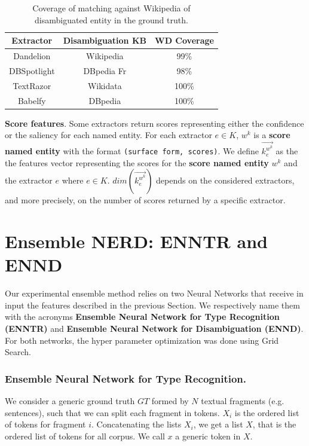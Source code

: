 \documentclass{llncs}
\begin{document}
\begin{table}
\centering
\label{tab:qmatch}
\begin{tabular}{|c|c|c|}
\hline
\textbf{Extractor} & \textbf{Disambiguation KB} & \textbf{WD Coverage} \\ \hline
Dandelion    & Wikipedia   & 99\%     \\ \hline
DBSpotlight  & DBpedia Fr  & 98\%     \\ \hline
TextRazor    & Wikidata    & 100\%    \\ \hline
Babelfy      & DBpedia     & 100\%    \\ \hline
\end{tabular}
\bigskip
\caption{Coverage of matching against Wikipedia of disambiguated entity in the ground truth.}
\end{table}

\textbf{Score features}. Some extractors return scores representing either the confidence or the saliency for each named entity. For each extractor $e \in K$, $w^k$ is a \textbf{score named entity} with the format \texttt{(surface form, scores)}. 
We define $\vec{k^{w^{k}}_{e}}$ as the the features vector representing the scores for the \textbf{score named entity} $w^k$ and the extractor $e$ where $e \in K$.  $dim(\vec{k^{w^{k}}_{e}})$ depends on the considered extractors, and more precisely, on the number of scores returned by a specific extractor.


\section{Ensemble NERD: ENNTR and ENND}
\label{sec:experiment}
Our experimental ensemble method relies on two Neural Networks that receive in input the features described in the previous Section. We respectively name them with the acronyms \textbf{Ensemble Neural Network for Type Recognition (ENNTR)} and \textbf{Ensemble Neural Network for Disambiguation (ENND)}. For both networks, the hyper parameter optimization was done using Grid Search.

\subsubsection{Ensemble Neural Network for Type Recognition.}
We consider a generic ground truth $GT$ formed by $N$ textual fragments (e.g. sentences), such that we can split each fragment in tokens. $X_i$ is the ordered list of tokens for fragment $i$. Concatenating the lists $X_i$, we get a list $X$, that is the ordered list of tokens for all corpus. We call $x$ a generic token in $X$. 
\end{document}
